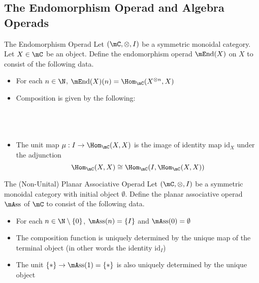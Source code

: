 \documentclass[a4paper]{article}
\begin{document}
\subsection{The Endomorphism Operad and Algebra Operads}
\begin{defn}{The Endomorphism Operad}{} Let $(\mC,\otimes,I)$ be a symmetric monoidal category. Let $X\in\mC$ be an object. Define the endomorphism operad $\mE\text{nd}(X)$ on $X$ to consist of the following data. 
\begin{itemize}
\item For each $n\in\N$, $\mE\text{nd}(X)(n)=\Hom_\mC(X^{\otimes n},X)$
\item Composition is given by the following: \\~\\
\\~\\
\item The unit map $\mu:I\to\Hom_\mC(X,X)$ is the image of identity map $\text{id}_X$ under the adjunction $$\Hom_\mC(X,X)\cong\Hom_\mC(I,\Hom_\mC(X,X))$$
\end{itemize}
\end{defn}

\begin{defn}{The (Non-Unital) Planar Associative Operad}{} Let $(\mC,\otimes,I)$ be a symmetric monoidal category with initial object $\emptyset$. Define the planar associative operad $\mA\text{ss}$ of $\mC$ to consist of the following data. 
\begin{itemize}
\item For each $n\in\N\setminus\{0\}$, $\mA\text{ss}(n)=\{I\}$ and $\mA\text{ss}(0)=\emptyset$
\item The composition function is uniquely determined by the unique map of the terminal object (in other words the identity $\text{id}_I$)
\item The unit $\{\ast\}\to\mA\text{ss}(1)=\{\ast\}$ is also uniquely determined by the unique object
\end{itemize}
\end{defn}
\end{document}
